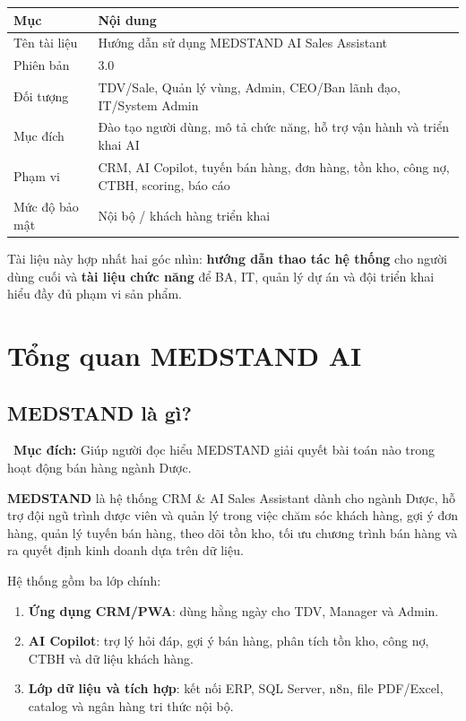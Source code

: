 \documentclass[12pt,a4paper,oneside,openany]{book}
\newcommand{\screenpurpose}[1]{\begin{tcolorbox}[colback=medgreen!8,colframe=medgreen!55,left=6pt,right=6pt,top=4pt,bottom=4pt]\faFlag\ \textbf{Mục đích:} #1\end{tcolorbox}}
\begin{document}
\begin{longtable}{p{4cm}p{10cm}}
\toprule
\textbf{Mục} & \textbf{Nội dung} \\
\midrule
Tên tài liệu & Hướng dẫn sử dụng MEDSTAND AI Sales Assistant \\
Phiên bản & 3.0 \\
Đối tượng & TDV/Sale, Quản lý vùng, Admin, CEO/Ban lãnh đạo, IT/System Admin \\
Mục đích & Đào tạo người dùng, mô tả chức năng, hỗ trợ vận hành và triển khai AI \\
Phạm vi & CRM, AI Copilot, tuyến bán hàng, đơn hàng, tồn kho, công nợ, CTBH, scoring, báo cáo \\
Mức độ bảo mật & Nội bộ / khách hàng triển khai \\
\bottomrule
\end{longtable}

\begin{tcolorbox}[noteBox]
Tài liệu này hợp nhất hai góc nhìn: \textbf{hướng dẫn thao tác hệ thống} cho người dùng cuối và \textbf{tài liệu chức năng} để BA, IT, quản lý dự án và đội triển khai hiểu đầy đủ phạm vi sản phẩm.
\end{tcolorbox}

\tableofcontents
\clearpage

\part{Tổng quan MEDSTAND AI}

\chapter{MEDSTAND là gì?}
\screenpurpose{Giúp người đọc hiểu MEDSTAND giải quyết bài toán nào trong hoạt động bán hàng ngành Dược.}

\textbf{MEDSTAND} là hệ thống CRM \& AI Sales Assistant dành cho ngành Dược, hỗ trợ đội ngũ trình dược viên và quản lý trong việc chăm sóc khách hàng, gợi ý đơn hàng, quản lý tuyến bán hàng, theo dõi tồn kho, tối ưu chương trình bán hàng và ra quyết định kinh doanh dựa trên dữ liệu.

Hệ thống gồm ba lớp chính:
\begin{enumerate}
  \item \textbf{Ứng dụng CRM/PWA}: dùng hằng ngày cho TDV, Manager và Admin.
  \item \textbf{AI Copilot}: trợ lý hỏi đáp, gợi ý bán hàng, phân tích tồn kho, công nợ, CTBH và dữ liệu khách hàng.
  \item \textbf{Lớp dữ liệu và tích hợp}: kết nối ERP, SQL Server, n8n, file PDF/Excel, catalog và ngân hàng tri thức nội bộ.
\end{enumerate}
\end{document}
